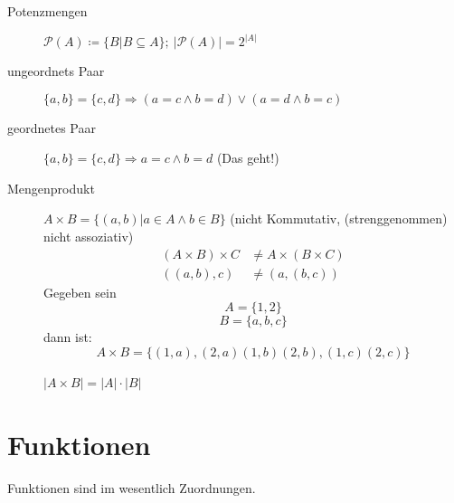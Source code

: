 \documentclass[12pt,a4paper]{article}
\begin{document}
\begin{description}
		
		\item[Potenzmengen] $\mathcal{P}(A) \coloneqq \lbrace B|B \subseteq A \rbrace;\ |\mathcal{P}(A)| = 2^{|A|}$
		
		\item[ungeordnets Paar] $\lbrace a,b \rbrace = \lbrace c,d \rbrace \Rightarrow (a=c \wedge b=d) \vee (a=d \wedge b=c)$
		
		\item[geordnetes Paar] $\lbrace a,b \rbrace = \lbrace c,d \rbrace \Rightarrow a=c \wedge b=d$ (Das geht!)
			
		\item[Mengenprodukt] $A \times B = \lbrace (a,b)|a \in A \wedge b \in B \rbrace$ (nicht Kommutativ, (strenggenommen) nicht assoziativ)
			\begin{align*}
				(A \times B) \times C &\not = A \times (B \times C) \\
				((a,b),c) &\not = (a,(b,c))
			\end{align*}
			Gegeben sein
			$$A = \lbrace 1, 2 \rbrace$$
			$$B = \lbrace a, b, c \rbrace$$
			dann ist:
			$$A \times B = \lbrace (1,a),(2,a)(1,b)(2,b),(1,c)(2,c) \rbrace$$ \\
			$|A \times B| = |A| \cdot |B|$
	\end{description}

\section{Funktionen}
Funktionen sind im wesentlich Zuordnungen.
\end{document}
